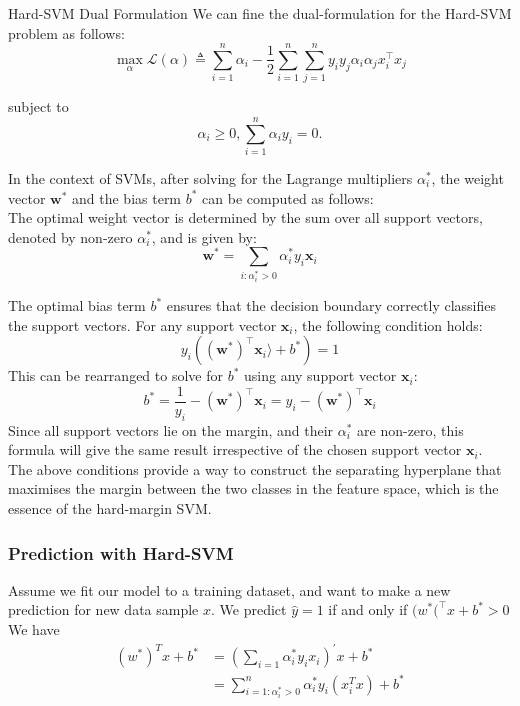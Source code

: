 \begin{definitionbox}{Hard-SVM Dual Formulation}
    We can fine the dual-formulation for the Hard-SVM problem as follows:
    \[
    \max_\alpha\mathcal{L}(\alpha)\triangleq\sum_{i=1}^n\alpha_i-\frac12\sum_{i=1}^n\sum_{j=1}^ny_iy_j\alpha_i\alpha_jx_i^\top x_j
    \]

    subject to \[\alpha_{i}\geq0,\sum_{i=1}^{n}\alpha_{i}y_{i}=0.\]
    
\end{definitionbox}
In the context of SVMs, after solving for the Lagrange multipliers $\alpha_i^*$, the weight vector $\mathbf{w}^*$ and the bias term $b^*$ can be computed as follows:\\

The optimal weight vector is determined by the sum over all support vectors, denoted by non-zero $\alpha_i^*$, and is given by:
\[
\mathbf{w}^* = \sum_{i:\alpha_i^*>0} \alpha_i^* y_i \mathbf{x}_i
\]

The optimal bias term $b^*$ ensures that the decision boundary correctly classifies the support vectors. For any support vector $\mathbf{x}_i$, the following condition holds:
\[
y_i( (\mathbf{w}^*)^\top \mathbf{x}_i \rangle + b^*) = 1
\]
This can be rearranged to solve for $b^*$ using any support vector $\mathbf{x}_i$:
\[
b^* = \frac{1}{y_i} -  (\mathbf{w}^*)^\top\mathbf{x}_i = y_i - (\mathbf{w}^*)^\top\mathbf{x}_i
\]
Since all support vectors lie on the margin, and their $\alpha_i^*$ are non-zero, this formula will give the same result irrespective of the chosen support vector $\mathbf{x}_i$.\\

The above conditions provide a way to construct the separating hyperplane that maximises the margin between the two classes in the feature space, which is the essence of the hard-margin SVM.


\subsubsection*{Prediction with Hard-SVM}
Assume we fit our model to a training dataset, and want to make a new prediction for new data sample $x$. We predict $\hat{y} = 1$ if and only if $(w^*(^\top x + b^* >0$\\

We have
\begin{align*}
(w^{*})^{T}x+b^{*}& =\left(\sum_{i=1}\alpha_i^*y_ix_i\right)^{\prime}x+b^*  \\
&=\sum_{i=1:\alpha_i^*>0}^n\alpha_i^*y_i(x_i^Tx)+b^*
\end{align*}



